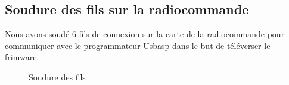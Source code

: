 	\subsection{Soudure des fils sur la radiocommande}
	Nous avons soudé 6 fils de connexion  sur la carte de la radiocommande pour communiquer avec le programmateur Usbasp dans le but de téléverser le frimware.
	\begin{figure}[H]
		\begin{center}
			\centering
		\end{center}
		\caption{Soudure des fils\label{fig:S.F}}
	\end{figure}
	
